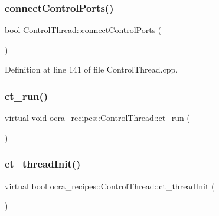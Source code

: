 \subsubsection{\texorpdfstring{connect\+Control\+Ports()}{connectControlPorts()}}
{\footnotesize\ttfamily bool Control\+Thread\+::connect\+Control\+Ports (\begin{DoxyParamCaption}{ }\end{DoxyParamCaption})\hspace{0.3cm}{\ttfamily [protected]}}



Definition at line 141 of file Control\+Thread.\+cpp.

\hypertarget{classocra__recipes_1_1ControlThread_a2890887a72bdae6d16af762455eb3d3f}{}\label{classocra__recipes_1_1ControlThread_a2890887a72bdae6d16af762455eb3d3f} 
\subsubsection{\texorpdfstring{ct\+\_\+run()}{ct\_run()}}
{\footnotesize\ttfamily virtual void ocra\+\_\+recipes\+::\+Control\+Thread\+::ct\+\_\+run (\begin{DoxyParamCaption}{ }\end{DoxyParamCaption})\hspace{0.3cm}{\ttfamily [pure virtual]}}

\hypertarget{classocra__recipes_1_1ControlThread_a4b2471a82ae344ea4c9e96943604cb94}{}\label{classocra__recipes_1_1ControlThread_a4b2471a82ae344ea4c9e96943604cb94} 
\subsubsection{\texorpdfstring{ct\+\_\+thread\+Init()}{ct\_threadInit()}}
{\footnotesize\ttfamily virtual bool ocra\+\_\+recipes\+::\+Control\+Thread\+::ct\+\_\+thread\+Init (\begin{DoxyParamCaption}{ }\end{DoxyParamCaption})\hspace{0.3cm}{\ttfamily [pure virtual]}}

